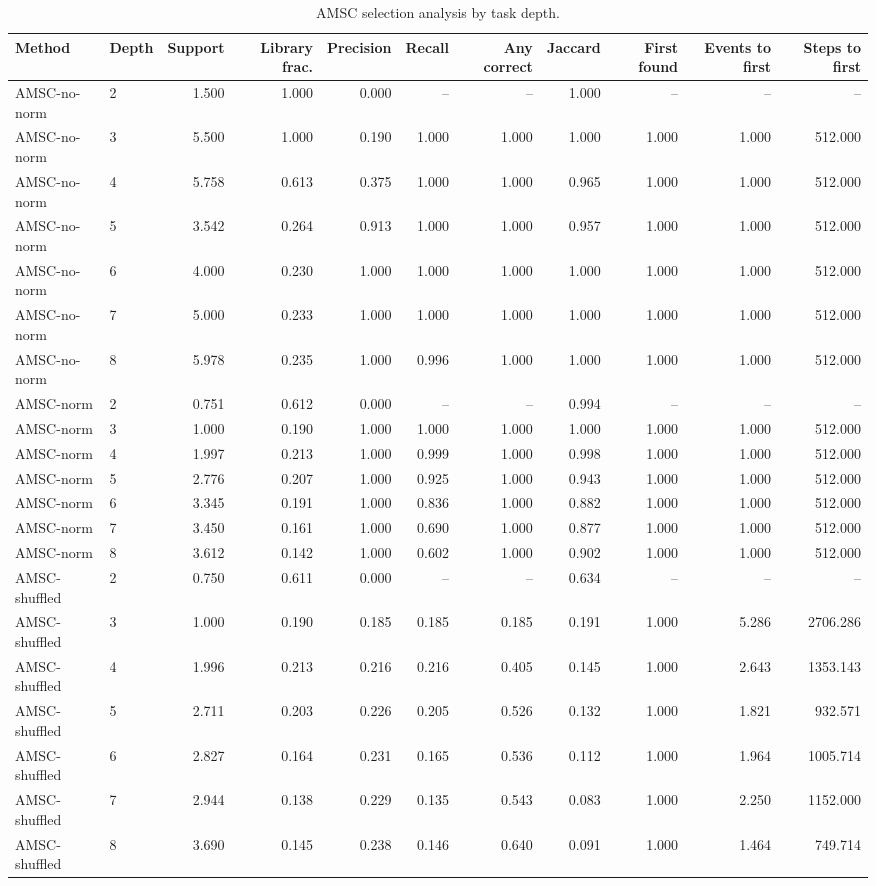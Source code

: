 \begin{table}[ht]
    \caption{AMSC selection analysis by task depth.}
    \label{tbl:amsc_selection_depth}
    \centering
    \scriptsize
    \begin{tabular}{llrrrrrrrrr}
    \toprule
Method & Depth & Support & Library frac. & Precision & Recall & Any correct & Jaccard & First found & Events to first & Steps to first \\
    \midrule
AMSC-no-norm & 2 & 1.500 & 1.000 & 0.000 & -- & -- & 1.000 & -- & -- & -- \\
AMSC-no-norm & 3 & 5.500 & 1.000 & 0.190 & 1.000 & 1.000 & 1.000 & 1.000 & 1.000 & 512.000 \\
AMSC-no-norm & 4 & 5.758 & 0.613 & 0.375 & 1.000 & 1.000 & 0.965 & 1.000 & 1.000 & 512.000 \\
AMSC-no-norm & 5 & 3.542 & 0.264 & 0.913 & 1.000 & 1.000 & 0.957 & 1.000 & 1.000 & 512.000 \\
AMSC-no-norm & 6 & 4.000 & 0.230 & 1.000 & 1.000 & 1.000 & 1.000 & 1.000 & 1.000 & 512.000 \\
AMSC-no-norm & 7 & 5.000 & 0.233 & 1.000 & 1.000 & 1.000 & 1.000 & 1.000 & 1.000 & 512.000 \\
AMSC-no-norm & 8 & 5.978 & 0.235 & 1.000 & 0.996 & 1.000 & 1.000 & 1.000 & 1.000 & 512.000 \\
AMSC-norm & 2 & 0.751 & 0.612 & 0.000 & -- & -- & 0.994 & -- & -- & -- \\
AMSC-norm & 3 & 1.000 & 0.190 & 1.000 & 1.000 & 1.000 & 1.000 & 1.000 & 1.000 & 512.000 \\
AMSC-norm & 4 & 1.997 & 0.213 & 1.000 & 0.999 & 1.000 & 0.998 & 1.000 & 1.000 & 512.000 \\
AMSC-norm & 5 & 2.776 & 0.207 & 1.000 & 0.925 & 1.000 & 0.943 & 1.000 & 1.000 & 512.000 \\
AMSC-norm & 6 & 3.345 & 0.191 & 1.000 & 0.836 & 1.000 & 0.882 & 1.000 & 1.000 & 512.000 \\
AMSC-norm & 7 & 3.450 & 0.161 & 1.000 & 0.690 & 1.000 & 0.877 & 1.000 & 1.000 & 512.000 \\
AMSC-norm & 8 & 3.612 & 0.142 & 1.000 & 0.602 & 1.000 & 0.902 & 1.000 & 1.000 & 512.000 \\
AMSC-shuffled & 2 & 0.750 & 0.611 & 0.000 & -- & -- & 0.634 & -- & -- & -- \\
AMSC-shuffled & 3 & 1.000 & 0.190 & 0.185 & 0.185 & 0.185 & 0.191 & 1.000 & 5.286 & 2706.286 \\
AMSC-shuffled & 4 & 1.996 & 0.213 & 0.216 & 0.216 & 0.405 & 0.145 & 1.000 & 2.643 & 1353.143 \\
AMSC-shuffled & 5 & 2.711 & 0.203 & 0.226 & 0.205 & 0.526 & 0.132 & 1.000 & 1.821 & 932.571 \\
AMSC-shuffled & 6 & 2.827 & 0.164 & 0.231 & 0.165 & 0.536 & 0.112 & 1.000 & 1.964 & 1005.714 \\
AMSC-shuffled & 7 & 2.944 & 0.138 & 0.229 & 0.135 & 0.543 & 0.083 & 1.000 & 2.250 & 1152.000 \\
AMSC-shuffled & 8 & 3.690 & 0.145 & 0.238 & 0.146 & 0.640 & 0.091 & 1.000 & 1.464 & 749.714 \\
    \bottomrule
    \end{tabular}
\end{table}
